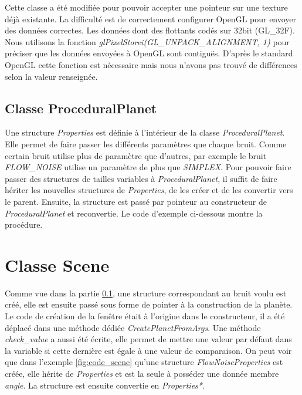   Cette classe a été modifiée pour pouvoir accepter une pointeur sur une texture déjà existante. 
  La difficulté est de correctement configurer OpenGL pour envoyer des données correctes. Les données dont des flottants codés sur 32bit (GL\_32F).\\
  Nous utilisons la fonction \textit{glPixelStorei(GL\_UNPACK\_ALIGNMENT, 1)} pour préciser que les données envoyées à OpenGL sont contiguës. D'après le standard OpenGL cette fonction est nécessaire mais 
  nous n'avons pas trouvé de différences selon la valeur renseignée.
  
  \subsection{Classe ProceduralPlanet}
    \label{sec::ProceduralPlanet}
  Une structure \textit{Properties} est définie à l'intérieur de la classe \textit{ProceduralPlanet}. Elle permet de faire passer les différents paramètres que chaque bruit. 
  Comme certain bruit utilise plus de paramètre que d'autres, par exemple le bruit \textit{FLOW_NOISE} utilise un paramètre de plus que \textit{SIMPLEX}. Pour pouvoir faire passer des structures de tailles variables à \textit{ProceduralPlanet}, il suffit de faire hériter les nouvelles structures de \textit{Properties}, de les créer et de les convertir vers le parent. Ensuite, la structure est passé par pointeur au constructeur de \textit{ProceduralPlanet} et reconvertie. Le code d'exemple ci-dessous montre la procédure.\\
  

  \section{Classe Scene}
  Comme vue dans la partie \ref{sec::ProceduralPlanet}, une structure correspondant au bruit voulu est créé,
  elle est ensuite passé sous forme de pointer à la construction de la planète.\\
  
  Le code de création de la fenêtre était à l'origine dans le constructeur, il a été déplacé dans une méthode dédiée \textit{CreatePlanetFromArgs}. Une méthode \textit{check_value} a aussi été écrite, elle permet de mettre une valeur par défaut dans la variable si cette dernière est égale à une valeur de comparaison. On peut voir que dans l'exemple \ref{fig:code_scene} qu'une structure \textit{FlowNoiseProperties} est créée, elle hérite de \textit{Properties} et est la seule à posséder une
  donnée membre \textit{angle}. La structure est ensuite convertie en \textit{Properties*}.\\
  

